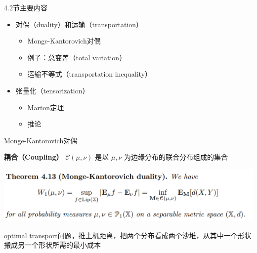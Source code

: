 \documentclass{beamer}
\begin{document}
\begin{frame}{4.2节主要内容}

\begin{itemize}
    \item 对偶（duality）和运输（transportation）
    \begin{itemize}
        \item Monge-Kantorovich对偶
        \item 例子：总变差（total variation）
        \item 运输不等式（transportation inequality）
    \end{itemize}
    
    \item 张量化（tensorization）
    \begin{itemize}
        \item Marton定理
        \item 推论
    \end{itemize}
\end{itemize}

\end{frame}

\begin{frame}{Monge-Kantorovich对偶}

\textbf{耦合（Coupling）} $\mathcal{C}(\mu, \nu)$ 是以 $\mu, \nu$ 为边缘分布的联合分布组成的集合

\begin{center}
\includegraphics[width=1.0\textwidth, frame]{figures/4-13-thm.png}
\end{center}

optimal transport问题，推土机距离，把两个分布看成两个沙堆，从其中一个形状搬成另一个形状所需的最小成本

\end{frame}
\end{document}
